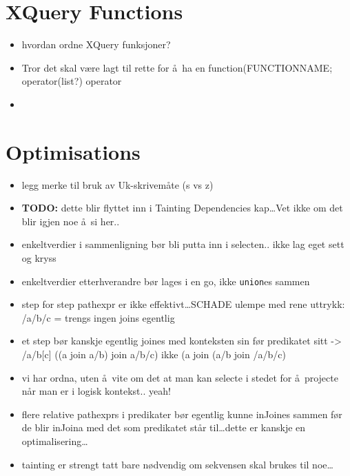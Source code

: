 \section{XQuery Functions}
\label{sect:disc:functions}
\begin{itemize}
  \item hvordan ordne XQuery funksjoner?
  \item Tror det skal v\ae re lagt til rette for \aa~ha en \textsf{function(FUNCTIONNAME; operator(list?)} operator
  \item 
\end{itemize}

\section{Optimisations}
\label{sect:disc:optimisations}
\begin{itemize}
  \item legg merke til bruk av Uk-skrivem\aa te (s vs z)
  \item \textbf{\Large TODO:} dette blir flyttet inn i Tainting Dependencies kap\ldots Vet ikke om det blir igjen
  noe \aa~si her..
  \item enkeltverdier i sammenligning b\o r bli putta inn i selecten.. ikke lag
  eget sett og kryss
  \item enkeltverdier etterhverandre b\o r lages i en go, ikke \texttt{union}es
  sammen
  \item step for step pathexpr er ikke effektivt\ldots SCHADE ulempe med rene uttrykk: /a/b/c = trengs ingen
  joins egentlig
  \item et step b\o r kanskje egentlig joines med konteksten sin f\o r predikatet sitt -> /a/b[c] ((a join a/b)
  join a/b/c) ikke (a join (a/b join /a/b/c)
  \item vi har ordna, uten \aa~vite om det at man kan selecte i stedet for \aa~projecte n\aa r man er i logisk
  kontekst.. yeah!
  \item flere relative pathexprs i predikater b\o r egentlig kunne inJoines sammen f\o r de blir inJoina
	med det som predikatet st\aa r til\ldots dette er kanskje en optimalisering\ldots
  \item tainting er strengt tatt bare n\o dvendig om sekvensen skal brukes til noe\ldots 
\end{itemize}